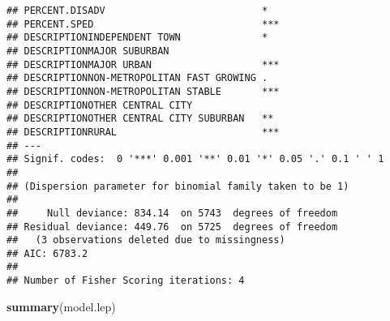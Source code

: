 \documentclass[
]{article}
\newenvironment{Shaded}{\begin{snugshade}}{\end{snugshade}}
\newcommand{\KeywordTok}[1]{\textcolor[rgb]{0.13,0.29,0.53}{\textbf{#1}}}
\newcommand{\NormalTok}[1]{#1}
\begin{document}
\begin{verbatim}
## PERCENT.DISADV                           *  
## PERCENT.SPED                             ***
## DESCRIPTIONINDEPENDENT TOWN              *  
## DESCRIPTIONMAJOR SUBURBAN                   
## DESCRIPTIONMAJOR URBAN                   ***
## DESCRIPTIONNON-METROPOLITAN FAST GROWING .  
## DESCRIPTIONNON-METROPOLITAN STABLE       ***
## DESCRIPTIONOTHER CENTRAL CITY               
## DESCRIPTIONOTHER CENTRAL CITY SUBURBAN   ** 
## DESCRIPTIONRURAL                         ***
## ---
## Signif. codes:  0 '***' 0.001 '**' 0.01 '*' 0.05 '.' 0.1 ' ' 1
## 
## (Dispersion parameter for binomial family taken to be 1)
## 
##     Null deviance: 834.14  on 5743  degrees of freedom
## Residual deviance: 449.76  on 5725  degrees of freedom
##   (3 observations deleted due to missingness)
## AIC: 6783.2
## 
## Number of Fisher Scoring iterations: 4
\end{verbatim}

\begin{Shaded}
\begin{Highlighting}[]
\KeywordTok{summary}\NormalTok{(model.lep)}
\end{Highlighting}
\end{Shaded}
\end{document}
